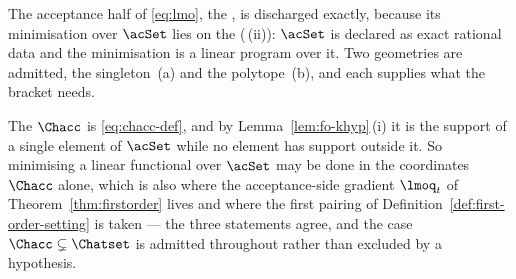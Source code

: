 \begin{remark}\label{rem:acc-side}
The acceptance half of \eqref{eq:lmo}, the
, is discharged exactly, because its
minimisation over $\acSet$ lies on the 
(\,(ii)): $\acSet$ is declared as exact rational
data and the minimisation is a linear program over it. Two geometries are
admitted, the singleton~(a) and the polytope~(b), and each supplies what
the bracket needs.

The  $\Chacc$ is \eqref{eq:chacc-def}, and by
Lemma~\ref{lem:fo-khyp}\,(i) it is the support of a single element of
$\acSet$ while no element has support outside it. So minimising a linear
functional over $\acSet$ may be done in the coordinates $\Chacc$ alone,
which is also where the acceptance-side gradient $\lmoq_t$ of
Theorem~\ref{thm:firstorder} lives and where the first pairing of
Definition~\ref{def:first-order-setting} is taken --- the three statements
agree, and the case $\Chacc\subsetneq\Chatset$ is admitted throughout rather
than excluded by a hypothesis.


\end{remark}
